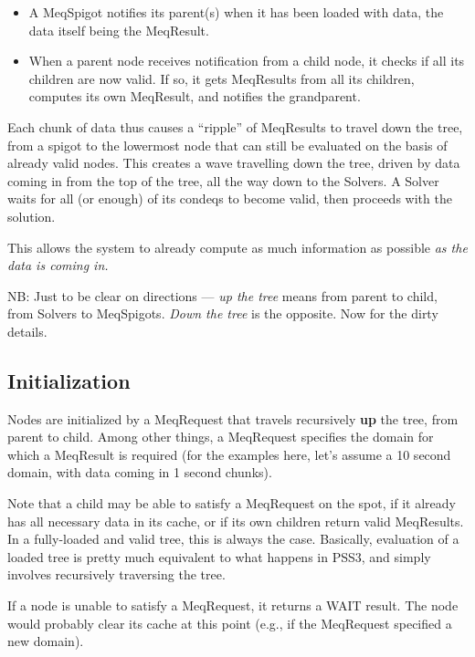 \documentclass[12pt]{article}
\begin{document}
  \begin{itemize} 
  
  \item A MeqSpigot notifies its parent(s) when it has been loaded with data,
  the data itself being the MeqResult.

  \item When a parent node receives notification from a child node, it checks
  if all its children are now valid. If so, it gets MeqResults from all its
  children, computes its own MeqResult, and notifies the grandparent.

  \end{itemize}
  
  Each chunk of data thus causes a ``ripple'' of MeqResults to travel down the
  tree, from a spigot to the lowermost node that can still be evaluated on the
  basis of already valid nodes. This creates a wave travelling down the tree,
  driven by data coming in from the top of the tree, all the way down to the
  Solvers. A Solver waits for all (or enough) of its condeqs to become valid,
  then proceeds with the solution.

  This allows the system to already compute as much information as possible
  {\em as the data is coming in.} 

  NB: Just to be clear on directions --- {\em up the tree} means from parent to
  child, from Solvers to MeqSpigots. {\em Down the tree} is the opposite. Now
  for the dirty details.

\subsection{Initialization}

  Nodes are initialized by a MeqRequest that travels recursively {\bf up} the
  tree, from parent to child. Among other things, a MeqRequest specifies the
  domain for which a MeqResult is required (for the examples here, let's
  assume a  10 second domain, with data coming in 1 second chunks).

  Note that a child may be able to satisfy a MeqRequest on the spot, if it
  already has all necessary data in its cache, or if its own children return
  valid MeqResults. In a fully-loaded and valid tree, this is always the case.
  Basically, evaluation of a loaded tree is pretty much equivalent to what
  happens in PSS3, and simply involves recursively traversing the tree. 
  
  If a node is unable to satisfy a MeqRequest, it returns a WAIT result. The
  node would probably clear its cache at this point (e.g., if the MeqRequest
  specified a new domain).
\end{document}
